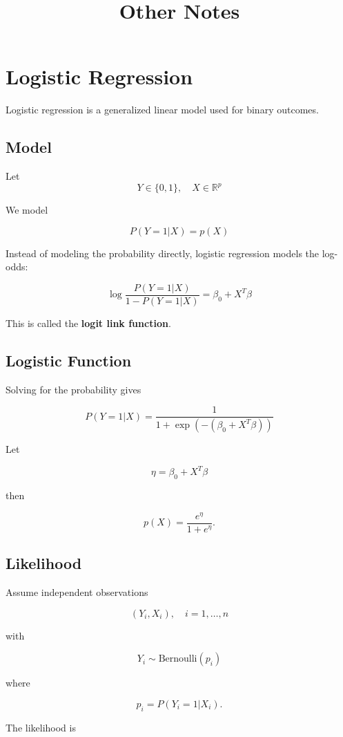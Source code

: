 \documentclass[a4paper,10pt]{article}
\title{Other Notes}
\author{}
\date{}
\begin{document}
\maketitle


\section{Logistic Regression}

Logistic regression is a generalized linear model used for binary outcomes.

\subsection{Model}

Let
\[
Y \in \{0,1\}, \quad X \in \mathbb{R}^p
\]

We model

\[
P(Y=1|X) = p(X)
\]

Instead of modeling the probability directly, logistic regression models the log-odds:

\[
\log \frac{P(Y=1|X)}{1-P(Y=1|X)}
=
\beta_0 + X^T\beta
\]

This is called the \textbf{logit link function}.

\subsection{Logistic Function}

Solving for the probability gives

\[
P(Y=1|X)
=
\frac{1}{1+\exp(-(\beta_0 + X^T\beta))}
\]

Let

\[
\eta = \beta_0 + X^T\beta
\]

then

\[
p(X) = \frac{e^\eta}{1+e^\eta}.
\]

\subsection{Likelihood}

Assume independent observations

\[
(Y_i, X_i), \quad i=1,\dots,n
\]

with

\[
Y_i \sim \text{Bernoulli}(p_i)
\]

where

\[
p_i = P(Y_i=1|X_i).
\]

The likelihood is
\end{document}
